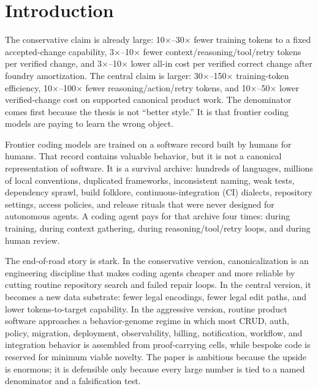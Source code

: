 \section{Introduction}

The conservative claim is already large: 10$\times$--30$\times$ fewer training tokens to a fixed accepted-change capability, 3$\times$--10$\times$ fewer context/reasoning/tool/retry tokens per verified change, and 3$\times$--10$\times$ lower all-in cost per verified correct change after foundry amortization. The central claim is larger: 30$\times$--150$\times$ training-token efficiency, 10$\times$--100$\times$ fewer reasoning/action/retry tokens, and 10$\times$--50$\times$ lower verified-change cost on supported canonical product work. The denominator comes first because the thesis is not ``better style.'' It is that frontier coding models are paying to learn the wrong object.

Frontier coding models are trained on a software record built by humans for humans. That record contains valuable behavior, but it is not a canonical representation of software. It is a survival archive: hundreds of languages, millions of local conventions, duplicated frameworks, inconsistent naming, weak tests, dependency sprawl, build folklore, continuous-integration (CI) dialects, repository settings, access policies, and release rituals that were never designed for autonomous agents. A coding agent pays for that archive four times: during training, during context gathering, during reasoning/tool/retry loops, and during human review.

The end-of-road story is stark. In the conservative version, canonicalization is an engineering discipline that makes coding agents cheaper and more reliable by cutting routine repository search and failed repair loops. In the central version, it becomes a new data substrate: fewer legal encodings, fewer legal edit paths, and lower tokens-to-target capability. In the aggressive version, routine product software approaches a behavior-genome regime in which most CRUD, auth, policy, migration, deployment, observability, billing, notification, workflow, and integration behavior is assembled from proof-carrying cells, while bespoke code is reserved for minimum viable novelty. The paper is ambitious because the upside is enormous; it is defensible only because every large number is tied to a named denominator and a falsification test.

